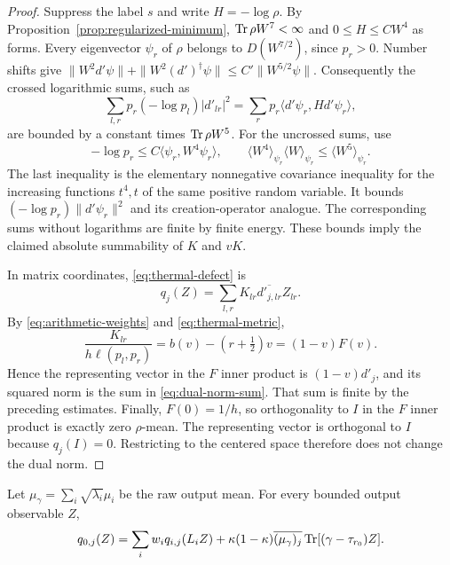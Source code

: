 \begin{proof}
Suppress the label $s$ and write $H=-\log\rho$.
By Proposition~\ref{prop:regularized-minimum},
$\operatorname{Tr}\rho W^7<\infty$ and $0\le H\le CW^4$ as forms.
Every eigenvector $\psi_r$ of $\rho$ belongs to $D(W^{7/2})$, since
$p_r>0$.  Number shifts give
$\|W^2d'\psi\|+\|W^2(d')^\dagger\psi\|
 \le C'\|W^{5/2}\psi\|$.
Consequently the crossed logarithmic sums, such as
\[
 \sum_{l,r}p_r(-\log p_l)|d'_{lr}|^2
 =\sum_r p_r\langle d'\psi_r,Hd'\psi_r\rangle,
\]
are bounded by a constant times $\operatorname{Tr}\rho W^5$.
For the uncrossed sums, use
\[
 -\log p_r\le C\langle\psi_r,W^4\psi_r\rangle,
 \qquad
 \langle W^4\rangle_{\psi_r}\langle W\rangle_{\psi_r}
 \le\langle W^5\rangle_{\psi_r}.
\]
The last inequality is the elementary nonnegative covariance inequality
for the increasing functions $t^4,t$ of the same positive random variable.
It bounds $(-\log p_r)\|d'\psi_r\|^2$ and its creation-operator analogue.
The corresponding sums without logarithms are finite by finite energy.
These bounds imply the claimed absolute summability of $K$ and $vK$.

In matrix coordinates, \eqref{eq:thermal-defect} is
\[
 q_j(Z)=\sum_{l,r}K_{lr}\overline{d'_{j,lr}}Z_{lr}.
\]
By \eqref{eq:arithmetic-weights} and \eqref{eq:thermal-metric},
\begin{equation}\label{eq:defect-multiplier}
 \frac{K_{lr}}{h\ell(p_l,p_r)}
 =b(v)-(r+\tfrac12)v=(1-v)F(v).
\end{equation}
Hence the representing vector in the $F$ inner product is
$(1-v)d'_j$, and its squared norm is the sum in
\eqref{eq:dual-norm-sum}.  That sum is finite by the preceding estimates.
Finally, $F(0)=1/h$, so orthogonality to $I$ in the $F$ inner product is
exactly zero $\rho$-mean.  The representing vector is orthogonal to $I$
because $q_j(I)=0$.  Restricting to the centered space therefore does not
change the dual norm.
\end{proof}

\begin{lemma}\label{lem:weak-traces}
Let $\mu_\gamma=\sum_i\sqrt{\lambda_i}\mu_i$ be the raw output mean.
For every bounded output observable $Z$,
\begin{equation}\label{eq:defect-convolution}
 q_{0,j}(Z)=\sum_i w_iq_{i,j}(L_iZ)
 +\kappa(1-\kappa)\overline{(\mu_\gamma)_j}
                  \operatorname{Tr}[(\gamma-\tau_{r_0})Z].
\end{equation}
\end{lemma}

